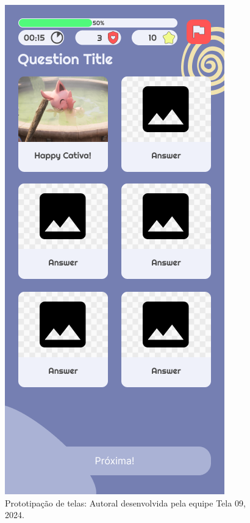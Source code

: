 \documentclass[12pt, openany, oneside, a4paper, english, brazil]{abntex2}   %
\begin{document}
\begin{figure}
    \centering
    \includegraphics[scale=0.7]{figuras/Math.Pow App/Question Multiple Choice Image Only.png}
    \caption{Prototipação de telas: Autoral desenvolvida pela equipe Tela 09, 2024.}
    \label{fig:nome-da-imagem}
\end{figure}
\end{document}
